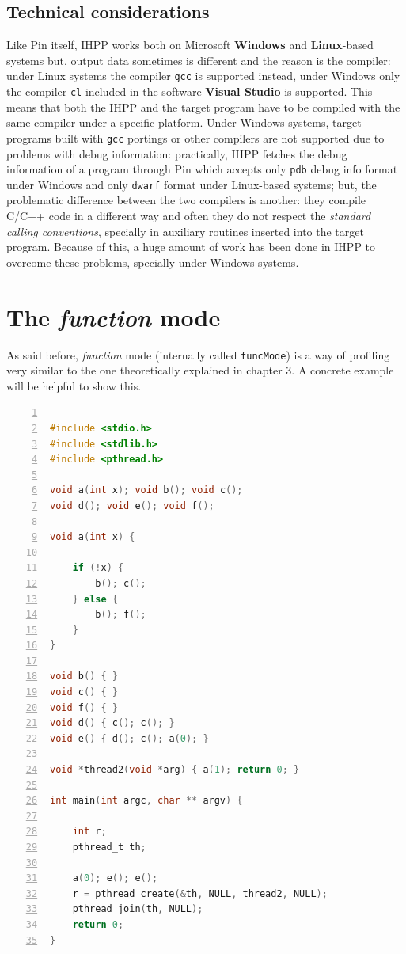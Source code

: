 \documentclass[a4paper,11pt]{report}
\begin{document}
\subsection{Technical considerations}

Like Pin itself, IHPP works both on Microsoft \textbf{Windows} and \textbf{Linux}-based systems but, output data sometimes is different and the reason is the compiler: 
under Linux systems the compiler \verb|gcc| is supported instead, under Windows only the compiler \verb|cl| included in the software \textbf{Visual Studio} is supported. 
This means that both the IHPP and the target program have to be compiled with the same compiler under a specific platform. Under Windows systems, target programs built with \verb|gcc| portings or other compilers are not supported due to problems with debug information: 
practically, IHPP fetches the debug information of a program through Pin which accepts only \verb|pdb| debug info format under Windows and only \verb|dwarf| format under Linux-based systems; but, the problematic difference between the two compilers is another: 
they compile C/C++ code in a different way and often they do not respect the \emph{standard calling conventions}, specially in auxiliary routines inserted into the target program. 
Because of this, a huge amount of work has been done in IHPP to overcome these problems, 
specially under Windows systems.

\section{The \emph{function} mode}

As said before, \emph{function} mode (internally called \verb|funcMode|) 
is a way of profiling very similar to the one theoretically explained in chapter 3.
A concrete example will be helpful to show this.

\begin{lstlisting}[language=C, 
	caption={prog1.c, a simple multi-threaded program}, 
	label=prog1, frame=leftline, numbers=left]

#include <stdio.h>
#include <stdlib.h>
#include <pthread.h>

void a(int x); void b(); void c();
void d(); void e(); void f();

void a(int x) { 

	if (!x) { 
		b(); c(); 
	} else { 
		b(); f();
	} 
}

void b() { }
void c() { }
void f() { }
void d() { c(); c(); }
void e() { d(); c(); a(0); }

void *thread2(void *arg) { a(1); return 0; }

int main(int argc, char ** argv) {

	int r;
	pthread_t th;

	a(0); e(); e();
	r = pthread_create(&th, NULL, thread2, NULL);
	pthread_join(th, NULL);
	return 0;
}

\end{lstlisting}
\end{document}
